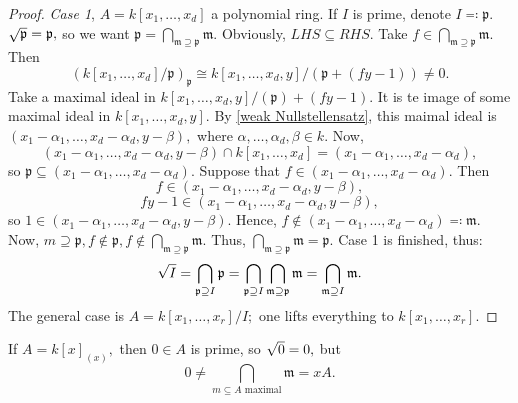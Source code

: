 \begin{proof}
  \emph{Case 1}, \(A = k[x_1, \dotsc, x_d]\) a polynomial ring.
  If \(I\) is prime, denote \(I \eqqcolon \mathfrak p.\) \(\sqrt{\mathfrak p} = \mathfrak p,\) so we want
  \(\mathfrak p = \bigcap_{\mathfrak m \supseteq \mathfrak p} \mathfrak m.\)
  Obviously, \(LHS \subseteq RHS.\)
  Take
  \(f \in \bigcap_{\mathfrak m \supseteq \mathfrak p} \mathfrak m.\) Then
  \[(k[x_1, \dotsc, x_d]/{\mathfrak p})_{\mathfrak p} \cong k[x_1, \dotsc, x_d, y]/{(\mathfrak p + (fy-1))} \neq 0.\]
  Take a maximal ideal in
  \(k[x_1, \dotsc, x_d, y]/{(\mathfrak p) + (fy-1)}.\)
  It is te image of some maximal ideal in
  \(k[x_1, \dotsc, x_d, y].\)
  By \cref{weak Nullstellensatz}, this maimal ideal is
  \((x_1 - \alpha_1, \dotsc, x_d - \alpha_d, y - \beta),\)
  where
  \(\alpha, \dotsc, \alpha_d, \beta \in k.\)
  Now,
  \[(x_1 - \alpha_1, \dotsc, x_d - \alpha_d, y - \beta) \cap k[x_1, \dotsc, x_d] = (x_1 - \alpha_1, \dotsc, x_d - \alpha_d),\]
  so \(\mathfrak p \subseteq (x_1 - \alpha_1, \dotsc, x_d - \alpha_d).\)
  Suppose that
  \(f \in (x_1 - \alpha_1, \dotsc, x_d - \alpha_d).\)
  Then
  \[f \in (x_1 - \alpha_1, \dotsc, x_d - \alpha_d, y-\beta),\]
  \[fy-1 \in (x_1 - \alpha_1, \dotsc, x_d - \alpha_d, y - \beta),\]
  so \(1 \in (x_1 - \alpha_1, \dotsc, x_d - \alpha_d, y - \beta).\)
  Hence,
  \(f \notin (x_1 - \alpha_1, \dotsc, x_d - \alpha_d) \eqqcolon \mathfrak m.\)
  Now,
  \(m \supseteq \mathfrak p, f \notin \mathfrak p, f \notin \bigcap_{\mathfrak m \supseteq \mathfrak p} \mathfrak m.\)
  Thus,
  \(\bigcap_{\mathfrak m \supseteq \mathfrak p} \mathfrak m = \mathfrak p.\)
  Case 1 is finished, thus:
  \[\sqrt{I} = \bigcap_{\mathfrak p \supseteq I} \mathfrak p = \bigcap_{\mathfrak p \supseteq I} \bigcap_{\mathfrak m \supseteq \mathfrak p} \mathfrak m = \bigcap_{\mathfrak m \supseteq I} \mathfrak m.\]
  The general case is
  \(A = k[x_1, \dotsc, x_r]/{I};\) one lifts everything to \(k[x_1, \dotsc, x_r].\)
\end{proof}

\begin{example}
  If \(A = k[x]_{(x)},\) then \(0 \in A\) is prime, so \(\sqrt{0} = 0,\) but \[0 \neq \bigcap_{m \subseteq A \text{ maximal}} \mathfrak m = x A.\]
\end{example}




